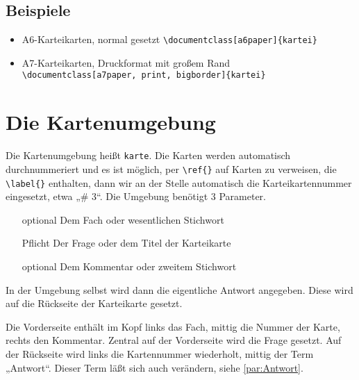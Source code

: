 \documentclass[a4paper]{article}
\begin{document}
\subsection{Beispiele}
\begin{itemize}
	\item A6-Karteikarten, normal gesetzt \lstinline!\documentclass[a6paper]{kartei}!
	\item A7-Karteikarten, Druckformat mit großem Rand\\ \lstinline!\documentclass[a7paper, print, bigborder]{kartei}!
\end{itemize}
%
%
%
\section{Die Kartenumgebung}
Die Kartenumgebung heißt \lstinline!karte!. Die Karten werden automatisch durchnummeriert und es ist möglich, per \lstinline!\ref{}! auf Karten zu verweisen, die \lstinline!\label{}! enthalten, dann wir an der Stelle automatisch die Karteikartennummer eingesetzt, etwa „\# 3“. Die Umgebung benötigt 3 Parameter.
\begin{enumerate}
	\item[optional] Dem Fach oder wesentlichen Stichwort
	\item[Pflicht] Der Frage oder dem Titel der Karteikarte
	\item[optional] Dem Kommentar oder zweitem Stichwort
\end{enumerate}
In der Umgebung selbst wird dann die eigentliche Antwort angegeben. Diese wird auf die Rückseite der Karteikarte gesetzt.

Die Vorderseite enthält im Kopf links das Fach, mittig die Nummer der Karte, rechts den Kommentar. Zentral auf der Vorderseite wird die Frage gesetzt. Auf der Rückseite wird links die Kartennummer wiederholt, mittig der Term „Antwort“. Dieser Term läßt sich auch verändern, siehe \ref{par:Antwort}.
\end{document}
